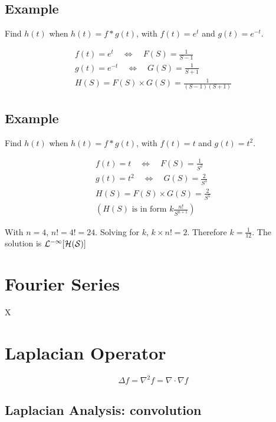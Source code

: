 \documentclass[12pt, a4paper]{article}
\begin{document}
\subsection{Example}
Find $h(t)$ when $h(t) = f*g(t)$, with $f(t)= e^{t}$ and $g(t)=
e^{-t}$.\newline

\begin{eqnarray}
f(t) = e^{t} \quad \Leftrightarrow \quad F(S)= \frac{1}{S-1}
 \nonumber\\
g(t) = e^{-t} \quad \Leftrightarrow \quad G(S)= \frac{1}{S+1}
 \nonumber\\
H(S) = F(S)\times G(S) = \frac{1}{(S-1)(S+1)}
 \nonumber
\end{eqnarray}
\subsection{Example}
Find $h(t)$ when $h(t) = f*g(t)$, with $f(t)= t$ and $g(t)=
t^2$.\newline

\begin{eqnarray}
f(t) = t \quad \Leftrightarrow \quad F(S)= \frac{1}{S^2}
 \nonumber\\
g(t) = t^2 \quad \Leftrightarrow \quad G(S)= \frac{2}{S^3}
 \nonumber\\
H(S) = F(S)\times G(S) = \frac{2}{S^5}
 \nonumber\\
(H(S) \mbox{ is in form }  k\frac{n!}{S^{n+1}} )
 \nonumber
\end{eqnarray}

With $n=4$, $n!= 4! = 24$. Solving for $k$, $k \times n! = 2$.
Therefore $k=\frac{1}{12}$. The solution is $\cal{L}^{-1}[H(S)]$



\section{Fourier Series}
X

\newpage



\section{Laplacian Operator}
\[\Delta f = \nabla^2 f = \nabla \cdot \nabla f\]




\subsection*{Laplacian Analysis: convolution}
\end{document}
